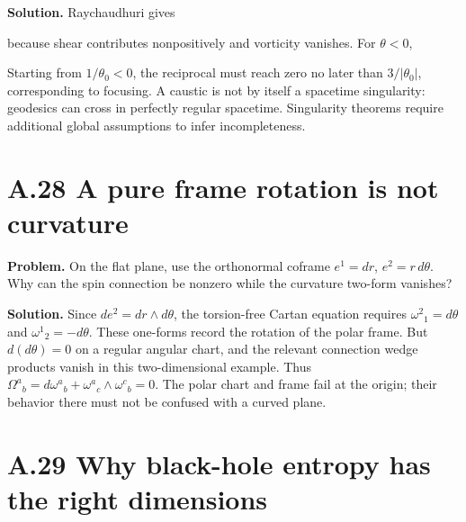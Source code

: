 \documentclass[
  11pt,
  letterpaper,
  oneside,
  openany]{scrbook}
\begin{document}
\textbf{Solution.} Raychaudhuri gives

\begin{center}
\begingroup
{}
\ifdim\wd\grmathbox>\linewidth
\resizebox{\linewidth}{!}{\usebox{\grmathbox}}
\else\usebox{\grmathbox}\fi
\endgroup
\end{center}

because shear contributes nonpositively and vorticity vanishes. For
\(\theta<0\),

\begin{center}
\begingroup
{}
\ifdim\wd\grmathbox>\linewidth
\resizebox{\linewidth}{!}{\usebox{\grmathbox}}
\else\usebox{\grmathbox}\fi
\endgroup
\end{center}

Starting from \(1/\theta_0<0\), the reciprocal must reach zero no later
than \(3/|\theta_0|\), corresponding to focusing. A caustic is not by
itself a spacetime singularity: geodesics can cross in perfectly regular
spacetime. Singularity theorems require additional global assumptions to
infer incompleteness.

\hypertarget{a.28-a-pure-frame-rotation-is-not-curvature}{%
\section{A.28 A pure frame rotation is not
curvature}\label{a.28-a-pure-frame-rotation-is-not-curvature}}

\textbf{Problem.} On the flat plane, use the orthonormal coframe
\(e^1=dr\), \(e^2=r\,d\theta\). Why can the spin connection be nonzero
while the curvature two-form vanishes?

\textbf{Solution.} Since \(de^2=dr\wedge d\theta\), the torsion-free
Cartan equation requires \(\omega^2{}_1=d\theta\) and
\(\omega^1{}_2=-d\theta\). These one-forms record the rotation of the
polar frame. But \(d(d\theta)=0\) on a regular angular chart, and the
relevant connection wedge products vanish in this two-dimensional
example. Thus
\(\Omega^a{}_b=d\omega^a{}_b+\omega^a{}_c\wedge\omega^c{}_b=0\). The
polar chart and frame fail at the origin; their behavior there must not
be confused with a curved plane.

\hypertarget{a.29-why-black-hole-entropy-has-the-right-dimensions}{%
\section{A.29 Why black-hole entropy has the right
dimensions}\label{a.29-why-black-hole-entropy-has-the-right-dimensions}}
\end{document}
